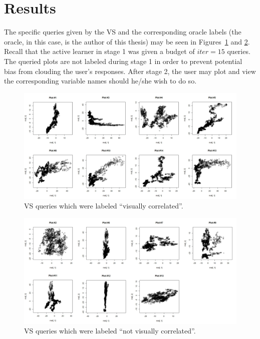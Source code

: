 \section{Results}
\label{sec:usage:results}

The specific queries given by the VS and the corresponding oracle labels 
(the oracle, in this case, is the author of this thesis) may be seen in 
Figures~\ref{fig:usage:interesting} and \ref{fig:usage:notinteresting}. Recall 
that the active learner in stage 1 was given a budget of $iter=15$ queries. The 
queried plots are not labeled during stage 1 in order to prevent potential bias 
from clouding the user's responses. After stage 2, the user may plot and view 
the corresponding variable names should he/she wish to do so.
 
\begin{figure}[htb]
	\begin{center}
		\includegraphics[width=1\linewidth]{ch-usage/figures/y_all}
		\caption[VS queries which were labeled ``visually correlated''.]{VS 
		queries which were labeled ``visually correlated''.}
		\label{fig:usage:interesting}
	\end{center}
\end{figure}

\tablespacing
\begin{figure}[H]
	\begin{center}
		\includegraphics[width=1\linewidth]{ch-usage/figures/n_all}
		\caption[VS queries which were labeled ``not visually correlated''.]{VS 
		queries which were labeled ``not visually correlated''.}
		\label{fig:usage:notinteresting}
	\end{center}
\end{figure}
\bodyspacing

